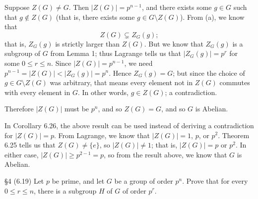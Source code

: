 \documentclass{homework}
\begin{document}
\begin{solution}
\begin{enumerate}[label=(\alph*)]
      Suppose $Z(G)\neq G$. Then $\left| Z(G) \right| =p^{n-1}$, and there exists some $g\in G$ such
      that $g\not\in Z(G)$ (that is, there exists some $g\in G\setminus Z(G)$). From (a), we know
      that \[
        Z(G)\subsetneq Z_G(g)
      ;\] that is, $Z_G(g)$ is strictly larger than $Z(G)$. But we know that $Z_G(g)$ is a subgroup
      of $G$ from Lemma 1; thus Lagrange tells us that $\left| Z_G(g) \right| =p^r$ for some $0\le
      r\le n$.  Since $\left| Z(G) \right| =p^{n-1}$, we need $p^{n-1}=\left| Z(G) \right|<\left|
      Z_G(g) \right| =p^{n}$. Hence $Z_G(g)=G$; but since the choice of $g\in G\setminus Z(G)$ was
      arbitrary, that means every element not in $Z(G)$ commutes with every element in $G$. In other
      words, $g\in Z(G)$; a contradiction. 

      Therefore $\left| Z(G) \right| $ must be $p^{n}$, and so $Z(G)=G$, and so $G$ is Abelian.
  \end{enumerate}

  In Corollary 6.26, the above result can be used instead of deriving a contradiction for $\left|
  Z(G) \right| =p$. From Lagrange, we know that $\left| Z(G) \right|=1$, $p$, or $p^2$. Theorem 6.25
  tells us that $Z(G)\neq \{ e \}$, so $\left| Z(G) \right| \neq 1$; that is, $\left| Z(G) \right|
  =p$ or $p^2$. In either case, $\left| Z(G) \right| \ge p^{2-1}=p$, so from the result above, we
  know that $G$ is Abelian.
\end{solution}


\begin{problem}{\S 4}
  (6.19) Let $p$ be prime, and let $G$ be a group of order $p^n$. Prove that for every $0\le r\le
  n$, there is a subgroup $H$ of $G$ of order $p^r$. 
\end{problem}
\end{document}
